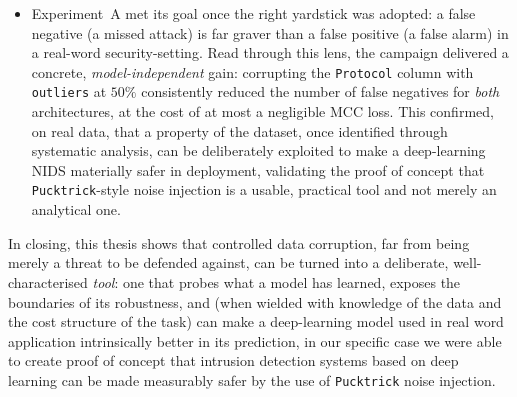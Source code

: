 \documentclass[a4paper, 9pt]{extarticle}
\begin{document}
\begin{itemize}
    \item Experiment~A met its goal once the right yardstick was adopted: a false negative (a missed attack) is far graver than a false positive (a false alarm) in a real-word security-setting. Read through this lens, the campaign delivered a concrete, \emph{model-independent} gain: corrupting the \texttt{Protocol} column with \texttt{outliers} at $50\%$ consistently reduced the number of false negatives for \emph{both} architectures, at the cost of at most a negligible MCC loss. This confirmed, on real data,  that a property of the dataset, once identified through systematic analysis, can be deliberately exploited to make a deep-learning NIDS materially safer in deployment, validating the proof of concept that \texttt{Pucktrick}-style noise injection is a usable, practical tool and not merely an analytical one.

\end{itemize}

In closing, this thesis shows that controlled data corruption, far from being merely a threat to be defended against, can be turned into a deliberate, well-characterised \emph{tool}: one that probes what a model has learned, exposes the boundaries of its robustness, and (when wielded with knowledge of the data
and the cost structure of the task) can make a deep-learning model used in real word application intrinsically better in its prediction, in our specific case we were able to create proof of concept that intrusion detection systems based on deep learning can be made measurably safer by the use of \texttt{Pucktrick} noise injection.
\end{document}
